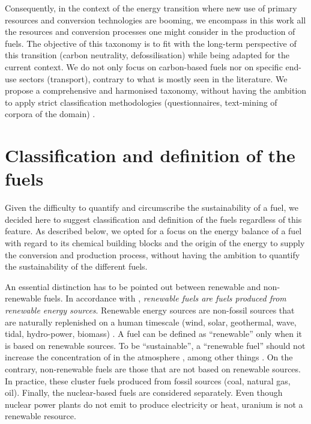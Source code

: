 Consequently, in the context of the energy transition where new use of primary resources and conversion technologies are booming, we encompass in this work all the resources and conversion processes one might consider in the production of fuels. The objective of this taxonomy is to fit with the long-term perspective of this transition (\eg carbon neutrality, defossilisation) while being adapted for the current context.  We do not only focus on carbon-based fuels nor on specific end-use sectors (\eg transport), contrary to what is mostly seen in the literature. We propose a comprehensive and harmonised taxonomy, without having the ambition to apply strict classification methodologies (\eg questionnaires, text-mining of corpora of the domain) \cite{ncbi_fossilfuel}.  %

\section{Classification and definition of the fuels}
\label{sec:definition}
Given the difficulty to quantify and circumscribe the sustainability of a fuel, we decided here to suggest classification and definition of the fuels regardless of this feature. As described below, we opted for a focus on the energy balance of a fuel with regard to its chemical building blocks and the origin of the energy to supply the conversion and production process, without having the ambition to quantify the sustainability of the different fuels.

An essential distinction has to be pointed out between renewable and non-renewable fuels. In accordance with \cite{eu2003directive}, \textit{renewable fuels are fuels produced from renewable energy sources}. Renewable energy sources are non-fossil sources that are naturally replenished on a human timescale (wind, solar, geothermal, wave, tidal, hydro-power, biomass) \cite{ellabban2014}. A fuel can be defined as ``renewable'' only when it is based on renewable sources. To be ``sustainable'', a ``renewable fuel'' should not increase the concentration of  in the atmosphere \cite{Dincer2020}, among other things \cite{eu_sustainable}.
On the contrary, non-renewable fuels are those that are not based on renewable sources. In practice, these cluster fuels produced from fossil sources (\eg coal, natural gas, oil). 
Finally, the nuclear-based fuels are considered separately. Even though nuclear power plants do not emit  to produce electricity or heat, uranium is not a renewable resource. 

